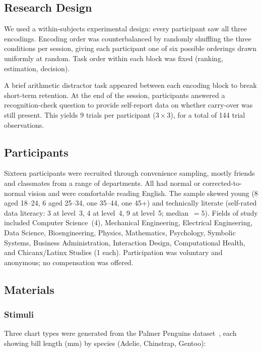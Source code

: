 \documentclass{article}
\begin{document}
\subsection{Research Design}

We used a within-subjects experimental design: every participant saw
all three encodings.  Encoding order was counterbalanced by randomly
shuffling the three conditions per session, giving each participant one
of six possible orderings drawn uniformly at random.  Task order within
each block was fixed (ranking, estimation, decision).

A brief arithmetic distractor task appeared between each encoding block
to break short-term retention.  At the end of the session, participants
answered a recognition-check question to provide self-report data on
whether carry-over was still present.  This yields 9 trials per
participant ($3 \times 3$), for a total of 144 trial observations.

\subsection{Participants}

Sixteen participants were recruited through convenience sampling,
mostly friends and classmates from a range of departments.  All had
normal or corrected-to-normal vision and were comfortable reading
English.  The sample skewed young (8 aged 18--24, 6 aged 25--34, one
35--44, one 45+) and technically literate (self-rated data literacy: 3
at level~3, 4 at level~4, 9 at level~5; median~$= 5$).  Fields of
study included Computer Science~(4), Mechanical Engineering, Electrical
Engineering, Data Science, Bioengineering, Physics, Mathematics,
Psychology, Symbolic Systems, Business Administration, Interaction
Design, Computational Health, and Chicanx/Latinx Studies (1 each).
Participation was voluntary and anonymous; no compensation was offered.

\subsection{Materials}

\subsubsection*{Stimuli}

Three chart types were generated from the Palmer Penguins
dataset~\cite{horst2020}, each showing bill length (mm) by species
(Adelie, Chinstrap, Gentoo):
\end{document}

